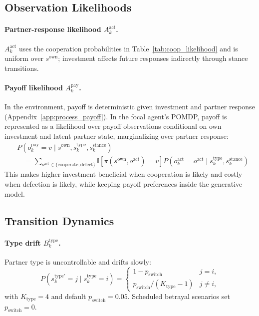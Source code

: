 \documentclass[runningheads,orivec]{llncs}
\begin{document}
\subsection{Observation Likelihoods}
\label{app:pomdp_likelihoods}

\paragraph{Partner-response likelihood \(A^{\mathrm{act}}_k\).}
\(A^{\mathrm{act}}_k\) uses the cooperation probabilities in Table~\ref{tab:coop_likelihood} and is uniform over \(s^{\mathrm{own}}\); investment affects future responses indirectly through stance transitions.

\paragraph{Payoff likelihood \(A^{\mathrm{pay}}_k\).}
In the environment, payoff is deterministic given investment and partner response (Appendix~\ref{app:process_payoff}). In the focal agent's POMDP, payoff is represented as a likelihood over payoff observations conditional on own investment and latent partner state, marginalizing over partner response:
\begin{equation}
\begin{split}
&P(o^{\mathrm{pay}}_k=v \mid s^{\mathrm{own}},s^{\mathrm{type}}_k,s^{\mathrm{stance}}_k) \\
&\quad= \sum_{o^{\mathrm{act}}\in\{\mathrm{cooperate},\mathrm{defect}\}}
\mathbb{I}\!\left[\pi(s^{\mathrm{own}},o^{\mathrm{act}})=v\right]
P(o^{\mathrm{act}}_k=o^{\mathrm{act}} \mid s^{\mathrm{type}}_k,s^{\mathrm{stance}}_k)
\end{split}
\label{eq:a_pay_marginal}
\end{equation}
This makes higher investment beneficial when cooperation is likely and costly when defection is likely, while keeping payoff preferences inside the generative model.

\subsection{Transition Dynamics}

\paragraph{Type drift \(B_k^{\mathrm{type}}\).}
Partner type is uncontrollable and drifts slowly:
\begin{equation}
P(s_k^{\mathrm{type}\prime}=j\mid s_k^{\mathrm{type}}=i)=
\begin{cases}
1-p_{\mathrm{switch}} & j=i,\\
p_{\mathrm{switch}}/(K_{\mathrm{type}}-1) & j\neq i,
\end{cases}
\label{eq:b_type}
\end{equation}
with $K_{\mathrm{type}}=4$ and default $p_{\mathrm{switch}}=0.05$. Scheduled betrayal scenarios set $p_{\mathrm{switch}}=0$.
\end{document}
